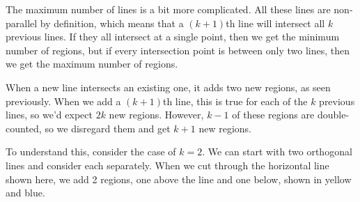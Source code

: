 \documentclass[a4paper]{article}
\begin{document}
\begin{figure}[h]
\centering
{}
\hspace{15ex}
\end{figure}

The maximum number of lines is a bit more complicated. All these lines are non-parallel by definition, which means that a $(k + 1)$th line will intersect all $k$ previous lines. If they all intersect at a single point, then we get the minimum number of regions, but if every intersection point is between only two lines, then we get the maximum number of regions.

When a new line intersects an existing one, it adds two new regions, as seen previously. When we add a $(k + 1)$th line, this is true for each of the $k$ previous lines, so we'd expect $2k$ new regions. However, $k - 1$ of these regions are double-counted, so we disregard them and get $k + 1$ new regions.

To understand this, consider the case of $k = 2$. We can start with two orthogonal lines and consider each separately. When we cut through the horizontal line shown here, we add 2 regions, one above the line and one below, shown in yellow and blue.
\end{document}
